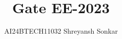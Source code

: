 \documentclass[journal]{IEEEtran}
\begin{document}

\vspace{3cm}

\title{Gate EE-2023}
\author{AI24BTECH11032 Shreyansh Sonkar}
{\let\newpage\relax\maketitle}

\renewcommand{\thefigure}{\theenumi}
\renewcommand{\thetable}{\theenumi}
\setlength{\intextsep}{10pt} %


\renewcommand{\thetable}{\theenumi}
\end{document}
